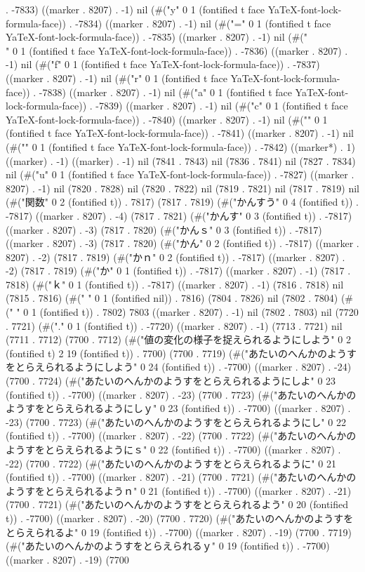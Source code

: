 . -7833) ((marker . 8207) . -1) nil (#("y" 0 1 (fontified t face YaTeX-font-lock-formula-face)) . -7834) ((marker . 8207) . -1) nil (#("=" 0 1 (fontified t face YaTeX-font-lock-formula-face)) . -7835) ((marker . 8207) . -1) nil (#("\\" 0 1 (fontified t face YaTeX-font-lock-formula-face)) . -7836) ((marker . 8207) . -1) nil (#("f" 0 1 (fontified t face YaTeX-font-lock-formula-face)) . -7837) ((marker . 8207) . -1) nil (#("r" 0 1 (fontified t face YaTeX-font-lock-formula-face)) . -7838) ((marker . 8207) . -1) nil (#("a" 0 1 (fontified t face YaTeX-font-lock-formula-face)) . -7839) ((marker . 8207) . -1) nil (#("c" 0 1 (fontified t face YaTeX-font-lock-formula-face)) . -7840) ((marker . 8207) . -1) nil (#("{" 0 1 (fontified t face YaTeX-font-lock-formula-face)) . -7841) ((marker . 8207) . -1) nil (#("}" 0 1 (fontified t face YaTeX-font-lock-formula-face)) . -7842) ((marker*) . 1) ((marker) . -1) ((marker) . -1) nil (7841 . 7843) nil (7836 . 7841) nil (7827 . 7834) nil (#("u" 0 1 (fontified t face YaTeX-font-lock-formula-face)) . -7827) ((marker . 8207) . -1) nil (7820 . 7828) nil (7820 . 7822) nil (7819 . 7821) nil (7817 . 7819) nil (#("関数" 0 2 (fontified t)) . 7817) (7817 . 7819) (#("かんすう" 0 4 (fontified t)) . -7817) ((marker . 8207) . -4) (7817 . 7821) (#("かんす" 0 3 (fontified t)) . -7817) ((marker . 8207) . -3) (7817 . 7820) (#("かんｓ" 0 3 (fontified t)) . -7817) ((marker . 8207) . -3) (7817 . 7820) (#("かん" 0 2 (fontified t)) . -7817) ((marker . 8207) . -2) (7817 . 7819) (#("かｎ" 0 2 (fontified t)) . -7817) ((marker . 8207) . -2) (7817 . 7819) (#("か" 0 1 (fontified t)) . -7817) ((marker . 8207) . -1) (7817 . 7818) (#("ｋ" 0 1 (fontified t)) . -7817) ((marker . 8207) . -1) (7816 . 7818) nil (7815 . 7816) (#(" " 0 1 (fontified nil)) . 7816) (7804 . 7826) nil (7802 . 7804) (#(" " 0 1 (fontified t)) . 7802) 7803 ((marker . 8207) . -1) nil (7802 . 7803) nil (7720 . 7721) (#("." 0 1 (fontified t)) . -7720) ((marker . 8207) . -1) (7713 . 7721) nil (7711 . 7712) (7700 . 7712) (#("値の変化の様子を捉えられるようにしよう" 0 2 (fontified t) 2 19 (fontified t)) . 7700) (7700 . 7719) (#("あたいのへんかのようすをとらえられるようにしよう" 0 24 (fontified t)) . -7700) ((marker . 8207) . -24) (7700 . 7724) (#("あたいのへんかのようすをとらえられるようにしよ" 0 23 (fontified t)) . -7700) ((marker . 8207) . -23) (7700 . 7723) (#("あたいのへんかのようすをとらえられるようにしｙ" 0 23 (fontified t)) . -7700) ((marker . 8207) . -23) (7700 . 7723) (#("あたいのへんかのようすをとらえられるようにし" 0 22 (fontified t)) . -7700) ((marker . 8207) . -22) (7700 . 7722) (#("あたいのへんかのようすをとらえられるようにｓ" 0 22 (fontified t)) . -7700) ((marker . 8207) . -22) (7700 . 7722) (#("あたいのへんかのようすをとらえられるように" 0 21 (fontified t)) . -7700) ((marker . 8207) . -21) (7700 . 7721) (#("あたいのへんかのようすをとらえられるようｎ" 0 21 (fontified t)) . -7700) ((marker . 8207) . -21) (7700 . 7721) (#("あたいのへんかのようすをとらえられるよう" 0 20 (fontified t)) . -7700) ((marker . 8207) . -20) (7700 . 7720) (#("あたいのへんかのようすをとらえられるよ" 0 19 (fontified t)) . -7700) ((marker . 8207) . -19) (7700 . 7719) (#("あたいのへんかのようすをとらえられるｙ" 0 19 (fontified t)) . -7700) ((marker . 8207) . -19) (7700 